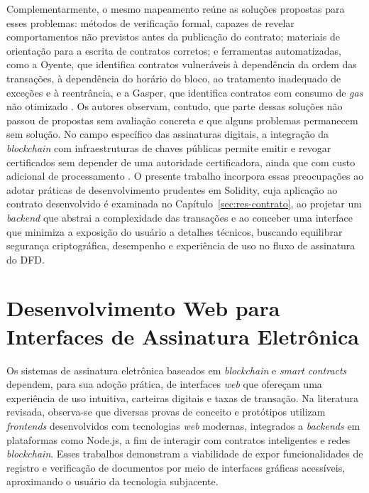 \documentclass[
    12pt,
    a4paper,
    oneside,
    chapter=TITLE,
    section=TITLE,
    subsection=TITLE,
    subsubsection=TITLE,
    sumario=tradicional,
    english,
    brazil
]{abntex2}
\begin{document}
Complementarmente, o mesmo mapeamento reúne as soluções propostas
para esses problemas: métodos de verificação formal, capazes de
revelar comportamentos não previstos antes da publicação do contrato;
materiais de orientação para a escrita de contratos corretos; e
ferramentas automatizadas, como a Oyente, que identifica contratos
vulneráveis à dependência da ordem das transações, à dependência do
horário do bloco, ao tratamento inadequado de exceções e à
reentrância, e a Gasper, que identifica contratos com consumo de
\emph{gas} não otimizado \cite{alharby2017}. Os autores observam, contudo, que
parte dessas soluções não passou de propostas sem avaliação concreta e
que alguns problemas permanecem sem solução. No campo específico das
assinaturas digitais, a integração da \emph{blockchain} com
infraestruturas de chaves públicas permite emitir e revogar
certificados sem depender de uma autoridade certificadora, ainda que
com custo adicional de processamento \cite{halder2024}. O presente
trabalho incorpora essas preocupações ao adotar práticas de
desenvolvimento prudentes em Solidity, cuja aplicação ao contrato
desenvolvido é examinada no Capítulo~\ref{sec:res-contrato}, ao
projetar um \emph{backend} que abstrai a complexidade das
transações e ao conceber uma interface que minimiza a exposição do
usuário a detalhes técnicos, buscando equilibrar segurança
criptográfica, desempenho e experiência de uso no fluxo de assinatura
do DFD.

\section{Desenvolvimento Web para Interfaces de Assinatura Eletrônica}
\label{sec:web}

Os sistemas de assinatura eletrônica baseados em \emph{blockchain} e
\emph{smart contracts} dependem, para sua adoção prática, de
interfaces \emph{web} que ofereçam uma experiência de uso intuitiva,
carteiras digitais e taxas de transação. Na literatura revisada,
observa-se que diversas provas de conceito e protótipos utilizam
\emph{frontends} desenvolvidos com tecnologias \emph{web} modernas,
integrados a \emph{backends} em plataformas como Node.js, a fim de
interagir com contratos inteligentes e redes \emph{blockchain}. Esses
trabalhos demonstram a viabilidade de expor funcionalidades de
registro e verificação de documentos por meio de interfaces gráficas
acessíveis, aproximando o usuário da tecnologia subjacente.
\end{document}

